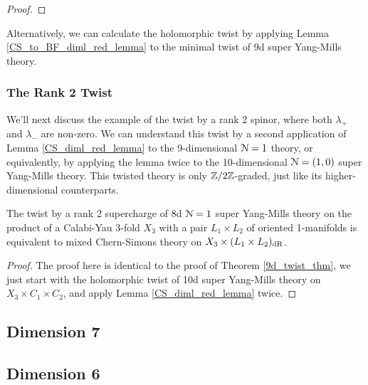 \documentclass[10pt, oneside]{article}
\begin{document}
\begin{proof}

\end{proof}

\begin{remark}
Alternatively, we can calculate the holomorphic twist by applying Lemma \ref{CS_to_BF_diml_red_lemma} to the minimal twist of 9d super Yang-Mills theory.
\end{remark}

\subsubsection{The Rank 2 Twist}
We'll next discuss the example of the twist by a rank 2 spinor, where both $\lambda_+$ and $\lambda_-$ are non-zero.  We can understand this twist by a second application of Lemma \ref{CS_diml_red_lemma} to the 9-dimensional $\mathcal{N}=1$ theory, or equivalently, by applying the lemma twice to the 10-dimensional $\mathcal{N}=(1,0)$ super Yang-Mills theory.  This twisted theory is only $\mathbb Z/2\mathbb Z$-graded, just like its higher-dimensional counterparts.

\begin{theorem} \label{8d_rank2_twist_thm}
The twist by a rank 2 supercharge of 8d $\mathcal{N}=1$ super Yang-Mills theory on the product of a Calabi-Yau 3-fold $X_3$ with a pair $L_1 \times L_2$ of oriented 1-manifolds is equivalent to mixed Chern-Simons theory on $X_3 \times (L_1 \times L_2)_{\mathrm{dR}}$.
\end{theorem}

\begin{proof}
The proof here is identical to the proof of Theorem \ref{9d_twist_thm}, we just start with the holomorphic twist of 10d super Yang-Mills theory on $X_3 \times C_1 \times C_2$, and apply Lemma \ref{CS_diml_red_lemma} twice.
\end{proof}



\subsection{Dimension 7}


\subsection{Dimension 6}
\end{document}
